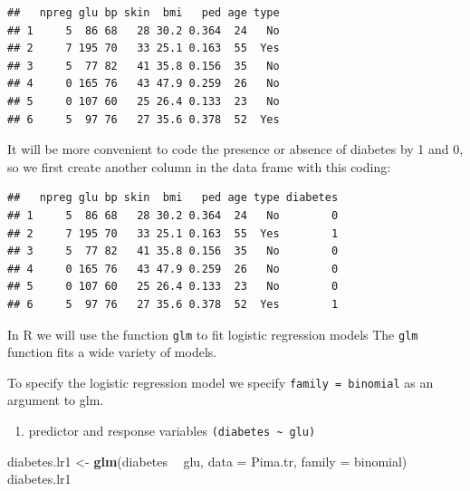 \documentclass[]{article}
\newenvironment{Shaded}{\begin{snugshade}}{\end{snugshade}}
\newcommand{\KeywordTok}[1]{\textcolor[rgb]{0.13,0.29,0.53}{\textbf{#1}}}
\newcommand{\DataTypeTok}[1]{\textcolor[rgb]{0.13,0.29,0.53}{#1}}
\newcommand{\DecValTok}[1]{\textcolor[rgb]{0.00,0.00,0.81}{#1}}
\newcommand{\StringTok}[1]{\textcolor[rgb]{0.31,0.60,0.02}{#1}}
\newcommand{\OperatorTok}[1]{\textcolor[rgb]{0.81,0.36,0.00}{\textbf{#1}}}
\newcommand{\NormalTok}[1]{#1}
\providecommand{\tightlist}{%
  \setlength{\itemsep}{0pt}\setlength{\parskip}{0pt}}
\begin{document}
\begin{verbatim}
##   npreg glu bp skin  bmi   ped age type
## 1     5  86 68   28 30.2 0.364  24   No
## 2     7 195 70   33 25.1 0.163  55  Yes
## 3     5  77 82   41 35.8 0.156  35   No
## 4     0 165 76   43 47.9 0.259  26   No
## 5     0 107 60   25 26.4 0.133  23   No
## 6     5  97 76   27 35.6 0.378  52  Yes
\end{verbatim}

It will be more convenient to code the presence or absence of diabetes
by 1 and 0, so we first create another column in the data frame with
this coding:

\begin{Shaded}
\end{Shaded}

\begin{verbatim}
##   npreg glu bp skin  bmi   ped age type diabetes
## 1     5  86 68   28 30.2 0.364  24   No        0
## 2     7 195 70   33 25.1 0.163  55  Yes        1
## 3     5  77 82   41 35.8 0.156  35   No        0
## 4     0 165 76   43 47.9 0.259  26   No        0
## 5     0 107 60   25 26.4 0.133  23   No        0
## 6     5  97 76   27 35.6 0.378  52  Yes        1
\end{verbatim}

In R we will use the function \texttt{glm} to fit logistic regression
models The \texttt{glm} function fits a wide variety of models.

To specify the logistic regression model we specify
\texttt{family\ =\ binomial} as an argument to glm.

\begin{enumerate}
\def\labelenumi{\arabic{enumi}.}
\tightlist
\item
  predictor and response variables
  \texttt{(diabetes\ \textasciitilde{}\ glu)}
\end{enumerate}

\begin{Shaded}
\begin{Highlighting}[]
\NormalTok{diabetes.lr1 <-}\StringTok{ }\KeywordTok{glm}\NormalTok{(diabetes }\OperatorTok{~}\StringTok{ }\NormalTok{glu, }\DataTypeTok{data =}\NormalTok{ Pima.tr, }\DataTypeTok{family =}\NormalTok{ binomial)}
\NormalTok{diabetes.lr1}
\end{Highlighting}
\end{Shaded}
\end{document}
